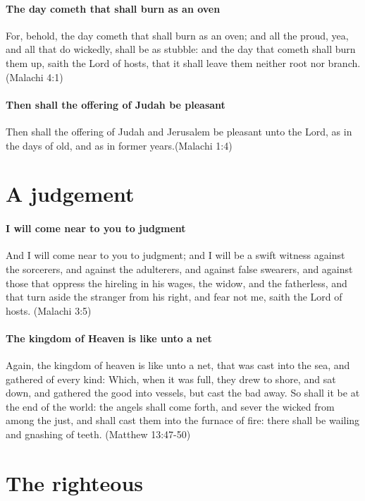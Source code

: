 \paragraph{The day cometh that shall burn as an oven}
For, behold, the day cometh that shall burn as an oven; and all the proud, yea, and all that do wickedly, shall be as stubble: and the day that cometh shall burn them up, saith the Lord of hosts, that it shall leave them neither root nor branch. (Malachi 4:1)

\paragraph{Then shall the offering of Judah be pleasant}
Then shall the offering of Judah and Jerusalem be pleasant unto the Lord, as in the days of old, and as in former years.(Malachi 1:4)

\section{A judgement}

\paragraph{I will come near to you to judgment}
And I will come near to you to judgment; and I will be a swift witness against the sorcerers, and against the adulterers, and against false swearers, and against those that oppress the hireling in his wages, the widow, and the fatherless, and that turn aside the stranger from his right, and fear not me, saith the Lord of hosts. (Malachi 3:5)

\paragraph{The kingdom of Heaven is like unto a net}
Again, the kingdom of heaven is like unto a net, that was cast into the sea, and gathered of every kind: Which, when it was full, they drew to shore, and sat down, and gathered the good into vessels, but cast the bad away. So shall it be at the end of the world: the angels shall come forth, and sever the wicked from among the just, and shall cast them into the furnace of fire: there shall be wailing and gnashing of teeth. (Matthew 13:47-50)

\section{The righteous}


